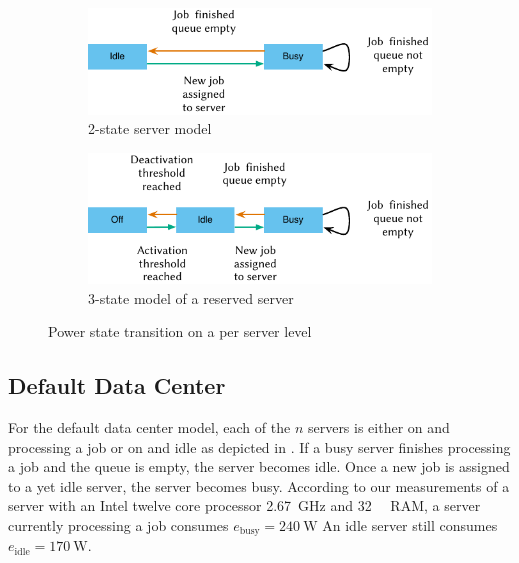 \begin{figure}
	\begin{subfigure}[b]{\textwidth}
	\centering
	\includegraphics{cloud/data_centers/problem_formulation/figures/idle_busy}
	\caption{2-state server model}\label{fig:cloud:data_centers:problem_formulation:servers:idle_busy}
	\end{subfigure} 
	\begin{subfigure}[b]{\textwidth}
	\centering
	\includegraphics{cloud/data_centers/problem_formulation/figures/idle_busy_off}
	\caption{3-state model of a reserved server}\label{fig:cloud:data_centers:problem_formulation:idle_busy_off}
	\end{subfigure}

	\caption{Power state transition on a per server level}\label{fig:cloud:data_centers:problem_formulation:servers}
\end{figure}

\subsection{Default Data Center}\label{sec:cloud:data_centers:problem_formulation:default_data_center}
For the default data center model, each of the \(n\) servers is either on and processing a job or on and idle as depicted in .
If a busy server finishes processing a job and the queue is empty, the server becomes idle. Once a new job is assigned to a yet idle server, the server becomes busy.
According to our measurements of a server with an Intel twelve core processor \SI{2.67}{\giga\hertz} and \SI{32}{\giga\byte} RAM, a server currently processing a job consumes \(e_{\text{busy}} = \SI{240}{\watt}\)
An idle server still consumes \(e_{\text{idle}} = \SI{170}{\watt}\).

